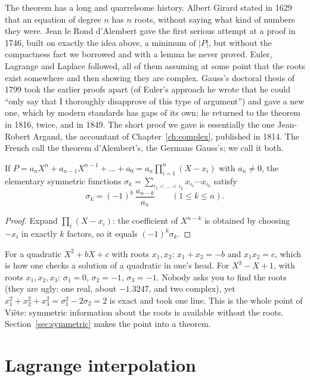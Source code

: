 The theorem has a long and quarrelsome history. Albert Girard stated in 1629 that an equation of degree $n$ has $n$ roots, without saying
what kind of numbers they were. Jean le Rond d'Alembert gave the first serious attempt at a proof in 1746, built on exactly the idea above, a
minimum of $|P|$, but without the compactness fact we borrowed and with a lemma he never proved. Euler, Lagrange and Laplace followed, all of them
assuming at some point that the roots exist somewhere and then showing they are complex. Gauss's doctoral thesis of 1799 took the earlier proofs
apart (of Euler's approach he wrote that he could ``only say that I thoroughly disapprove of this type of argument'') and gave a new one, which
by modern standards has gaps of its own; he returned to the theorem in 1816, twice, and in 1849. The short proof we gave is essentially the one
Jean-Robert Argand, the accountant of Chapter~\ref{ch:complex}, published in 1814. The French call the theorem d'Alembert's, the Germans Gauss's; we call it both.

\begin{proposition}\label{prop:viete}
If $P=a_nX^n+a_{n-1}X^{n-1}+\dots+a_0=a_n\prod_{i=1}^n(X-x_i)$ with $a_n\ne0$, the elementary symmetric functions
$\sigma_k=\sum_{i_1<\dots<i_k}x_{i_1}\cdots x_{i_k}$ satisfy
\[
\sigma_k=(-1)^k\,\frac{a_{n-k}}{a_n}\qquad(1\le k\le n).
\]
\end{proposition}
\begin{proof}
Expand $\prod_i(X-x_i)$: the coefficient of $X^{n-k}$ is obtained by choosing $-x_i$ in exactly $k$ factors, so it equals $(-1)^k\sigma_k$.
\end{proof}

\begin{examplex}
For a quadratic $X^2+bX+c$ with roots $x_1,x_2$: $x_1+x_2=-b$ and $x_1x_2=c$, which is how one checks a solution of a quadratic in one's head.
For $X^3-X+1$, with roots $x_1,x_2,x_3$: $\sigma_1=0$, $\sigma_2=-1$, $\sigma_3=-1$. Nobody asks you to find the roots (they are ugly: one real,
about $-1.3247$, and two complex), yet $x_1^2+x_2^2+x_3^2=\sigma_1^2-2\sigma_2=2$ is exact and took one line. This is the whole point of Vi\`ete:
symmetric information about the roots is available without the roots. Section~\ref{sec:symmetric} makes the point into a theorem.
\end{examplex}

\section{Lagrange interpolation}

